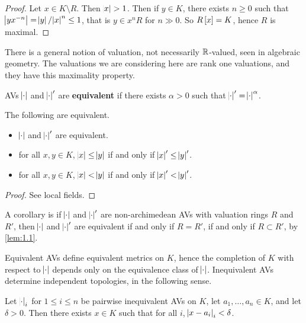 \begin{proof}
Let $ x \in K \setminus R $. Then $ \abs{x} > 1 $. Then if $ y \in K $, there exists $ n \ge 0 $ such that $ \abs{yx^{-n}} = \abs{y} / \abs{x}^n \le 1 $, that is $ y \in x^nR $ for $ n \gg 0 $. So $ R\sbr{x} = K $, hence $ R $ is maximal.
\end{proof}

\begin{remark*}
There is a general notion of valuation, not necessarily $ \mathbb{R} $-valued, seen in algebraic geometry. The valuations we are considering here are rank one valuations, and they have this maximality property.
\end{remark*}

AVs $ \abs{\cdot} $ and $ \abs{\cdot}' $ are \textbf{equivalent} if there exists $ \alpha > 0 $ such that $ \abs{\cdot}' = \abs{\cdot}^\alpha $.

\begin{proposition}
\label{prop:1.2}
The following are equivalent.
\begin{itemize}
\item $ \abs{\cdot} $ and $ \abs{\cdot}' $ are equivalent.
\item for all $ x, y \in K $, $ \abs{x} \le \abs{y} $ if and only if $ \abs{x}' \le \abs{y}' $.
\item for all $ x, y \in K $, $ \abs{x} < \abs{y} $ if and only if $ \abs{x}' < \abs{y}' $.
\end{itemize}
\end{proposition}

\begin{proof}
See local fields.
\end{proof}

A corollary is if $ \abs{\cdot} $ and $ \abs{\cdot}' $ are non-archimedean AVs with valuation rings $ R $ and $ R' $, then $ \abs{\cdot} $ and $ \abs{\cdot}' $ are equivalent if and only if $ R = R' $, if and only if $ R \subset R' $, by \ref{lem:1.1}.

\pagebreak

Equivalent AVs define equivalent metrics on $ K $, hence the completion of $ K $ with respect to $ \abs{\cdot} $ depends only on the equivalence class of $ \abs{\cdot} $. Inequivalent AVs determine independent topologies, in the following sense.

\begin{proposition}
Let $ \abs{\cdot}_i $ for $ 1 \le i \le n $ be pairwise inequivalent AVs on $ K $, let $ a_1, \dots, a_n \in K $, and let $ \delta > 0 $. Then there exists $ x \in K $ such that for all $ i $, $ \abs{x - a_i}_i < \delta $.
\end{proposition}

